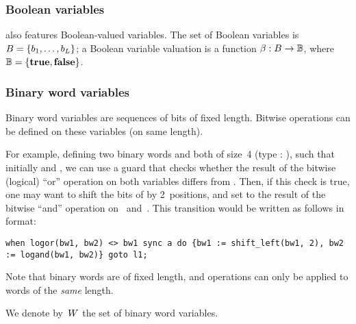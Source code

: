 \subsubsection{Boolean variables}

\imitator{} also features Boolean-valued variables.
The set of Boolean variables is $B = \{ b_1, \dots, b_L \} $;
a Boolean variable valuation is a function $\beta : B \rightarrow \mathbb B$, where $\mathbb B = \{\mathbf{true}, \mathbf{false} \}$.

\subsubsection{Binary word variables}

Binary word variables are sequences of bits of fixed length.
Bitwise operations can be defined on these variables (on same length).

For example, defining two binary words  and  both of size~4 (type : ), such that initially  and , we can use a guard  that checks whether the result of the bitwise (logical) ``or'' operation on both variables differs from .
Then, if this check is true, one may want to shift the bits of  by 2~positions, and set  to the result of the bitwise ``and'' operation on~ and~.
%
This transition would be written as follows in \imitator{} format:

\begin{lstlisting}[style=IMITATORmodel,numbers=none]
when logor(bw1, bw2) <> bw1 sync a do {bw1 := shift_left(bw1, 2), bw2 := logand(bw1, bw2)} goto l1;
\end{lstlisting}

Note that binary words are of fixed length, and operations can only be applied to words of the \emph{same} length.

We denote by~$W$ the set of binary word variables.


